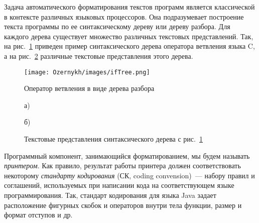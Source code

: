 Задача автоматического форматирования текстов программ является классической в контексте различных языковых процессоров.
Она подразумевает построение текста программы по ее синтаксическому дереву или дереву разбора.
Для каждого дерева существует множество различных текстовых представлений.
Так, на рис.~\ref{fig:ifTree} приведен пример синтаксического дерева оператора ветвления языка C, а на рис.~\ref{intro:treeToCode} различные текстовые представления этого дерева.
\begin{figure}[h]
	\centering
	\texttt{[image: Ozernykh/images/ifTree.png]}
	\caption{Оператор ветвления в виде дерева разбора}
	\label{fig:ifTree}
\end{figure}
\noindent
{}
\begin{figure}[ht]
  \noindent
  \begin{minipage}{.4\textwidth}
    
    \vspace{1cm}
    \caption*{а) }    
  \end{minipage}
  \hfill
  \begin{minipage}{.5\textwidth}
    
    \caption*{б)}    
  \end{minipage}
  \caption{Текстовые представления синтаксического дерева с рис.~\ref{fig:ifTree}}
  \label{intro:treeToCode}
\end{figure}
\noindent
Программный компонент, занимающийся форматированием, мы будем называть \emph{принтером}.
Как правило, результат работы принтера должен соответствовать некоторому \emph{стандарту кодирования} (СК, coding convension)~--- набору правил и соглашений, используемых при написании кода на соответствующем языке программирования.
Так, стандарт кодирования для языка Java задает расположение фигурных скобок и операторов внутри тела функции, размер и формат отступов и др.

